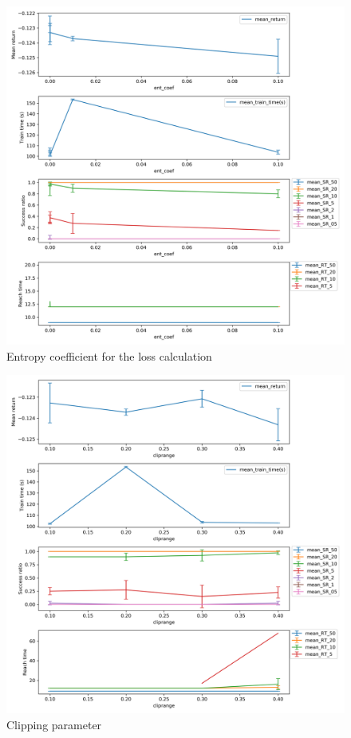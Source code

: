 \documentclass{article}
\begin{document}
\begin{figure}[H]
    \centering
    \includegraphics[width=\textwidth]{../ppo2_ent_coef.png}
\caption{Entropy coefficient for the loss calculation}
\end{figure}


\begin{figure}[H]
    \centering
    \includegraphics[width=\textwidth]{../ppo2_cliprange.png}
\caption{Clipping parameter}
\end{figure}
\end{document}
